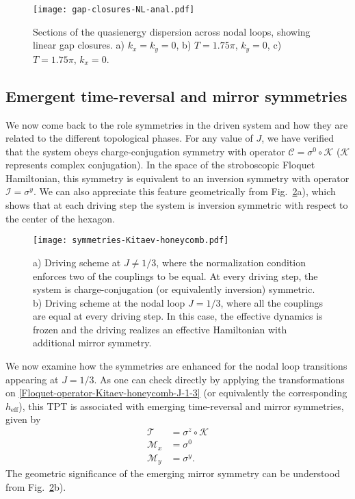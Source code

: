\documentclass[aps,prb,twocolumn,superscriptaddress,groupedaddress]{revtex4}
\begin{document}
\begin{figure}
\centering
\texttt{[image: gap-closures-NL-anal.pdf]}
\caption{Sections of the quasienergy dispersion across nodal loops, showing linear gap closures. a) $k_x=k_y=0$, b) $T=1.75\pi$, $k_y=0$, c) $T=1.75\pi$, $k_x=0$.}
\label{fig:gap-closures-NL-anal}
\end{figure}




\subsection{Emergent time-reversal and mirror symmetries}

We now come back to the role symmetries in the driven system and how they are related to the different topological phases.
For any value of $J$, we have verified that the system obeys charge-conjugation symmetry with operator $\mathcal{C} = \sigma^0 \circ \mathcal{K}$ ($\mathcal{K}$ represents complex conjugation).
In the space of the stroboscopic Floquet Hamiltonian, this symmetry is equivalent to an inversion symmetry with operator $\mathcal{I}=\sigma^y$.
We can also appreciate this feature geometrically from Fig.~\ref{fig:symmetries-Kitaev-honeycomb}a), which shows that at each driving step the system is inversion symmetric with respect to the center of the hexagon.

\begin{figure}
\centering
\texttt{[image: symmetries-Kitaev-honeycomb.pdf]}
\caption{a) Driving scheme at $J\neq 1/3$, where the normalization condition enforces two of the couplings to be equal.
At every driving step, the system is charge-conjugation (or equivalently inversion) symmetric.
b) Driving scheme at the nodal loop $J = 1/3$, where all the couplings are equal at every driving step. 
In this case, the effective dynamics is frozen and the driving realizes an effective Hamiltonian with additional mirror symmetry.}
\label{fig:symmetries-Kitaev-honeycomb}
\end{figure}

We now examine how the symmetries are enhanced for the nodal loop transitions appearing at $J=1/3$.
As one can check directly by applying the transformations on \eqref{Floquet-operator-Kitaev-honeycomb-J-1-3} (or equivalently the corresponding $h_{\text{eff}}$), this TPT is associated with emerging time-reversal  and mirror symmetries, given by
%
\begin{align}
\mathcal{T} &= \sigma^z \circ \mathcal{K} \\
\mathcal{M}_x &= \sigma^0  \\
\mathcal{M}_y &= \sigma^y.
\end{align}
%
The geometric significance of the emerging mirror symmetry can be understood from Fig.~\ref{fig:symmetries-Kitaev-honeycomb}b).
\end{document}
